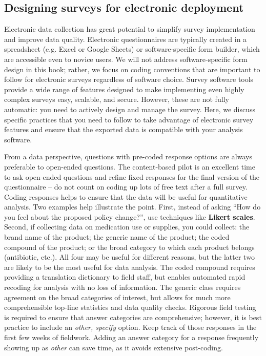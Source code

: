 \subsection{Designing surveys for electronic deployment}

Electronic data collection has great potential to simplify survey implementation and improve data quality.
Electronic questionnaires are typically created in a spreadsheet (e.g. Excel or Google Sheets)
or software-specific form builder, which are accessible even to novice users.
We will not address software-specific form design in this book;
rather, we focus on coding conventions that are important to follow
for electronic surveys regardless of software choice.
Survey software tools provide a wide range of features
designed to make implementing even highly complex surveys easy, scalable, and secure.
However, these are not fully automatic: you need to actively design and manage the survey.
Here, we discuss specific practices that you need to follow
to take advantage of electronic survey features
and ensure that the exported data is compatible with your analysis software.

From a data perspective, questions with pre-coded response options
are always preferable to open-ended questions.
The content-based pilot is an excellent time to ask open-ended questions
and refine fixed responses for the final version of the questionnaire --
do not count on coding up lots of free text after a full survey.
Coding responses helps to ensure that the data will be useful for quantitative analysis.
Two examples help illustrate the point.
First, instead of asking ``How do you feel about the proposed policy change?'',
use techniques like \textbf{Likert scales}.
Second, if collecting data on medication use or supplies, you could collect:
the brand name of the product; the generic name of the product; the coded compound of the product;
or the broad category to which each product belongs (antibiotic, etc.).
All four may be useful for different reasons,
but the latter two are likely to be the most useful for data analysis.
The coded compound requires providing a translation dictionary to field staff,
but enables automated rapid recoding for analysis with no loss of information.
The generic class requires agreement on the broad categories of interest,
but allows for much more comprehensible top-line statistics and data quality checks.
Rigorous field testing is required to ensure that answer categories are comprehensive;
however, it is best practice to include an \textit{other, specify} option.
Keep track of those responses in the first few weeks of fieldwork.
Adding an answer category for a response frequently showing up as \textit{other} can save time,
as it avoids extensive post-coding.

